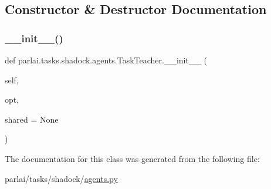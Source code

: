 \subsection{Constructor \& Destructor Documentation}
\mbox{\label{classparlai_1_1tasks_1_1shadock_1_1agents_1_1TaskTeacher_ae092a060ee469d5ffe511ad6bbed2fa9}} 
\subsubsection{\texorpdfstring{\+\_\+\+\_\+init\+\_\+\+\_\+()}{\_\_init\_\_()}}
{\footnotesize\ttfamily def parlai.\+tasks.\+shadock.\+agents.\+Task\+Teacher.\+\_\+\+\_\+init\+\_\+\+\_\+ (\begin{DoxyParamCaption}\item[{}]{self,  }\item[{}]{opt,  }\item[{}]{shared = {\ttfamily None} }\end{DoxyParamCaption})}



The documentation for this class was generated from the following file\+:\begin{DoxyCompactItemize}
\item 
parlai/tasks/shadock/\hyperlink{parlai_2tasks_2shadock_2agents_8py}{agents.\+py}\end{DoxyCompactItemize}
